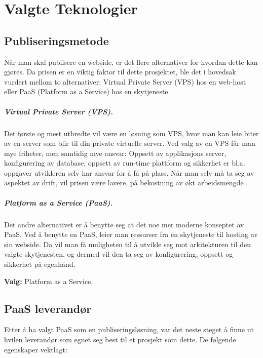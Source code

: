 \chapter{Valgte Teknologier}
\label{kap:valgte}

\section{Publiseringsmetode}
Når man skal publisere en webside, er det flere alternativer for hvordan dette kan gjøres. Da prisen er en viktig faktor til dette prosjektet, ble det i hovedsak vurdert mellom to alternativer: Virtual Private Server (VPS) hos en web-host eller PaaS (Platform as a Service) hos en skytjeneste.

\paragraph{Virtual Private Server (VPS).}Det første og mest utbredte vil være en løsning som VPS, hvor man kan leie biter av en server som blir til din private virtuelle server. Ved valg av en VPS får man mye friheter, men samtidig mye ansvar: Oppsett av applikasjons server, konfigurering av database, oppsett av run-time plattform og sikkerhet er bl.a. oppgaver utvikleren selv har ansvar for å få på plass. Når man selv må ta seg av aspektet av drift, vil prisen være lavere, på bekostning av økt arbeidsmengde \citep{webhost:about}.


\paragraph{Platform as a Service (PaaS).}Det andre alternativet er å benytte seg at det noe mer moderne konseptet av PaaS. Ved å benytte en PaaS, leier man ressurser fra en skytjeneste til hosting av sin webside. Da vil man få muligheten til å utvikle seg mot arkitekturen til den valgte skytjenesten, og dermed vil den ta seg av  konfigurering, oppsett og sikkerhet på egenhånd.

\textbf{Valg:} Platform as a Service.

\newpage
\section{PaaS leverandør}
Etter å ha valgt PaaS som en publiseringsløsning, var det neste steget å finne ut hvilen leverandør som egnet seg best til et prosjekt som dette. De følgende egenskaper vektlagt:


